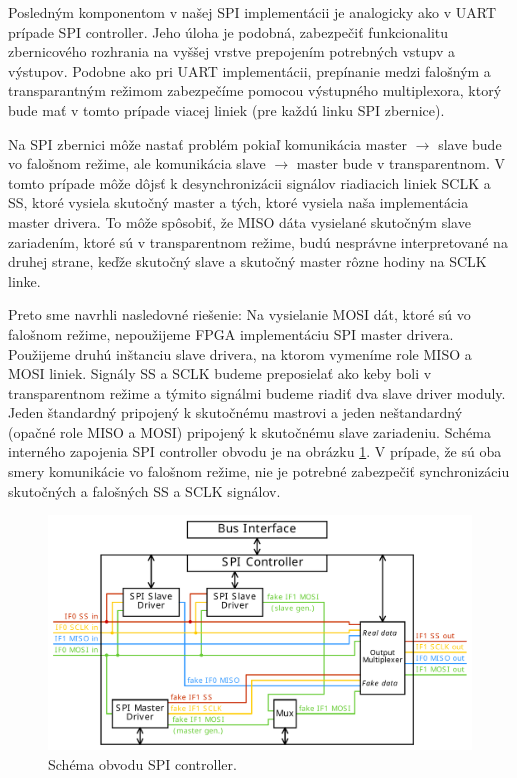 Posledným komponentom v našej SPI implementácii je analogicky ako v UART prípade SPI controller. Jeho úloha je podobná, zabezpečiť funkcionalitu zbernicového rozhrania na vyššej vrstve prepojením potrebných vstupv a výstupov. Podobne ako pri UART implementácii, prepínanie medzi falošným a transparantným režimom zabezpečíme pomocou výstupného multiplexora, ktorý bude mať v tomto prípade viacej liniek (pre každú linku SPI zbernice).

Na SPI zbernici môže nastať problém pokiaľ komunikácia master $\to$ slave bude vo falošnom režime, ale komunikácia slave $\to$ master bude v transparentnom. V tomto prípade môže dôjsť k desynchronizácii signálov riadiacich liniek SCLK a SS, ktoré vysiela skutočný master a tých, ktoré vysiela naša implementácia master drivera. To môže spôsobiť, že MISO dáta vysielané skutočným slave zariadením, ktoré sú v transparentnom režime, budú nesprávne interpretované na druhej strane, keďže skutočný slave a skutočný master  rôzne hodiny na SCLK linke.

Preto sme navrhli nasledovné riešenie: Na vysielanie MOSI dát, ktoré sú vo falošnom režime, nepoužijeme FPGA implementáciu SPI master drivera. Použijeme druhú inštanciu slave drivera, na ktorom vymeníme role MISO a MOSI liniek. Signály SS a SCLK budeme preposielať ako keby boli v transparentnom režime a týmito signálmi budeme riadiť dva slave driver moduly. Jeden štandardný pripojený k skutočnému mastrovi a jeden neštandardný (opačné role MISO a MOSI) pripojený k skutočnému slave zariadeniu. Schéma interného zapojenia SPI controller obvodu je na obrázku \ref{obr:spiController}. V prípade, že sú oba smery komunikácie vo falošnom režime, nie je potrebné zabezpečiť synchronizáciu skutočných a falošných SS a SCLK signálov.

\begin{figure}
    \centerline{\includegraphics[width=1\textwidth]{images/designs/spiController.pdf}}
    \caption[Schéma obvodu SPI controller]{Schéma obvodu SPI controller.}
    \label{obr:spiController}
\end{figure}

